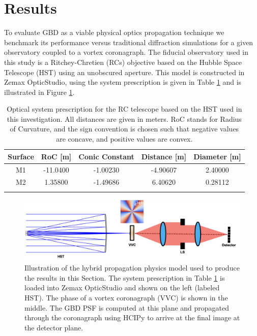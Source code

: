 \section{Results}
\label{sec:results}
To evaluate GBD as a viable physical optics propagation technique we benchmark its performance versus traditional diffraction simulations for a given observatory coupled to a vortex coronagraph. The fiducial observatory used in this study is a Ritchey-Chretien (RCs) objective based on the Hubble Space Telescope (HST) using an unobscured aperture. This model is constructed in Zemax OpticStudio, using the system prescription is given in Table \ref{tab:fiducial_observatory_specs} and is illustrated in Figure \ref{fig:telescope_model}.

\begin{table}[H]
    \centering
    \begin{tabular}{c c c c c}
        \hline
        Surface & RoC [m] & Conic Constant & Distance [m] & Diameter [m]  \\
        \hline
        M1 & -11.0400 & -1.00230 & -4.90607 & 2.40000 \\
        M2 & 1.35800 & -1.49686 &  6.40620 & 0.28112 \\
        \hline
        \\
    \end{tabular}
    \caption{Optical system prescription for the RC telescope based on the HST used in this investigation. All distances are given in meters. RoC stands for Radius of Curvature, and the sign convention is chosen such that negative values are concave, and positive values are convex.}
    \label{tab:fiducial_observatory_specs}
\end{table}

\begin{figure}[H]
    \centering
    \includegraphics[width=\textwidth]{telescope_model.png}
    \caption{Illustration of the hybrid propagation physics model used to produce the results in this Section. The system prescription in Table \ref{tab:fiducial_observatory_specs} is loaded into Zemax OpticStudio and shown on the left (labeled HST). The phase of a vortex coronagraph (VVC) is shown in the middle. The GBD PSF is computed at this plane and propagated through the coronagraph using HCIPy to arrive at the final image at the detector plane.}
    \label{fig:telescope_model}
\end{figure}


